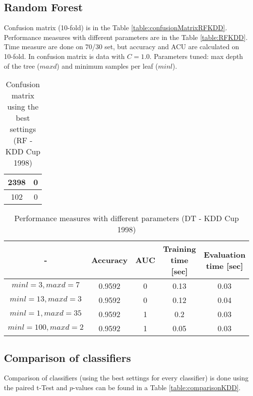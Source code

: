 \documentclass[11pt,a4paper,titlepage]{article}
\begin{document}
\subsection{Random Forest}
Confusion matrix (10-fold) is in the Table \ref{table:confusionMatrixRFKDD}. Performance measures with different parameters are in the Table \ref{table:RFKDD}. Time measure are done on 70/30 set, but accuracy and ACU are calculated on 10-fold. In confusion matrix is data with $C = 1.0$. Parameters tuned: max depth of the tree ($maxd$) and minimum samples per leaf ($minl$).
\begin{table}
  \centering
  \begin{tabular}{| c | c |}
    \hline
    2398 & 0  \\ \hline
    102 & 0 \\
    \hline
  \end{tabular}
  \caption{Confusion matrix using the best settings (RF - KDD Cup 1998)}
  \label{table:confusionMatrixDTKDD}
  \end{table}
  
  \begin{table}
  \centering
  \begin{tabular}{| c | c | c | c | c |}
    \hline
     		-	   & Accuracy & 	AUC 	& Training time [sec] & Evaluation time [sec] \\ \hline
    $minl=3, maxd=7$ &  0.9592 	  &     0		& 		0.13	  & 		0.03 		\\ \hline
    $minl=13, maxd=3$ & 	0.9592 	  &     0		& 		0.12		  & 		0.04	\\ \hline
    $minl=1, maxd=35$ & 	0.9592	  & 	1		& 		0.2		  &			0.03		\\ \hline
    $minl=100, maxd=2$ &  0.9592	  & 	1		& 		0.05		  &			0.03				\\
    \hline
  \end{tabular}
  \caption{Performance measures with different parameters (DT - KDD Cup 1998)}
  \label{table:DTKDD}
  \end{table}

\subsection{Comparison of classifiers}
Comparison of classifiers (using the best settings for every classifier) is done using the paired t-Test and $p$-values can be found in a Table \ref{table:comparisonKDD}.
\end{document}
